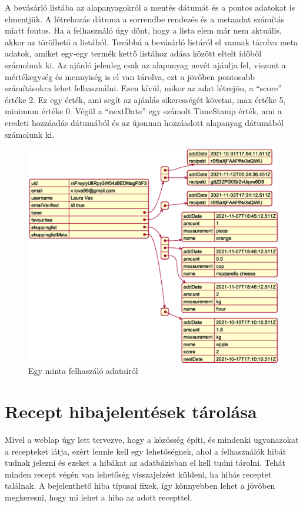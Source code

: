 \documentclass[12pt]{report}
\theoremstyle{definition}
\begin{document}
A bevásárló listába az alapanyagokról a mentés dátumát és a pontos adatokat is elmentjük. A létrehozás dátuma a sorrendbe rendezés és a metaadat számítás miatt fontos. Ha a felhasználó úgy dönt, hogy a lista elem már nem aktuális, akkor az törölhető a listából. Továbbá a bevásárló listáról el vannak tárolva meta adatok, amiket egy-egy termék kettő listához adása között eltelt időből számolunk ki. Az ajánló jelenleg csak az alapanyag nevét ajánlja fel, viszont a mértékegység és mennyiség is el van tárolva, ezt a jövőben pontosabb számításokra lehet felhasználni. Ezen kívül, mikor az adat létrejön, a “score” értéke 2. Ez egy érték, ami segít az ajánlás sikerességét követni, max értéke 5, minimum értéke 0. Végül a “nextDate” egy számolt TimeStamp érték, ami a eredeti hozzáadás dátumából és az újonnan hozzáadott alapanyag dátumából számolunk ki.

\noindent
\begin{figure}[H]
	\centering
	\includegraphics[width=\textwidth]{out/diagrams/jsonUsers/jsonUsers.eps}
	\caption{Egy minta felhaszáló adatairól}
    \label{fig:jsonUsers}
\end{figure}

\section{Recept hibajelentések tárolása} 
Mivel a weblap úgy lett tervezve, hogy a közösség építi, és mindenki ugyanazokat a recepteket látja, ezért lennie kell egy lehetőségnek, ahol a felhasználók hibát tudnak jelezni és ezeket a hibákat az adatbázisban el kell tudni tárolni. Tehát minden recept végén van lehetőség visszajelzést  küldeni, ha hibás receptet találnak. A bejelenthető hiba típusai fixek, így könnyebben lehet a jövőben megkeresni, hogy mi lehet a hiba az adott recepttel. 
\end{document}
